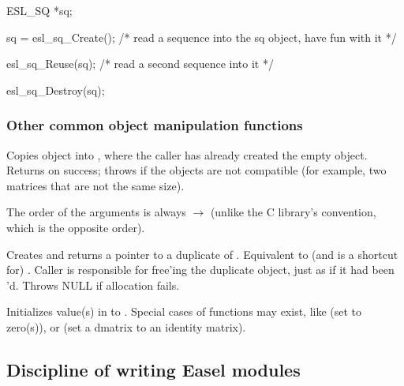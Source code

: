 \begin{sreitems}{}
\begin{cchunk}
ESL_SQ *sq;

sq = esl_sq_Create();
  /* read a sequence into the sq object, have fun with it */

esl_sq_Reuse(sq);
  /* read a second sequence into it */

esl_sq_Destroy(sq);
\end{cchunk}

\end{sreitems}

\subsubsection{Other common object manipulation functions}

\begin{sreitems}{}

\item[\ccode{\_Copy(src, dest)}]
Copies  object into , where the caller has
already created the empty  object. Returns 
on success; throws  if the objects are not
compatible (for example, two matrices that are not the same size).

The order of the arguments is always  $\rightarrow$
 (unlike the C library's  convention, which
is the opposite order).

\item[\ccode{\_Duplicate(obj)}] 

Creates and returns a pointer to a duplicate of .
Equivalent to (and is a shortcut for) . Caller is responsible for free'ing the duplicate
object, just as if it had been 'd. Throws NULL if
allocation fails.

\item[\ccode{\_Set*(obj, value...)}]

Initializes value(s) in  to . Special cases of
 functions may exist, like  (set to
zero(s)), or  (set a dmatrix to an
identity matrix).

\end{sreitems}


\subsection{Discipline of writing Easel modules}


